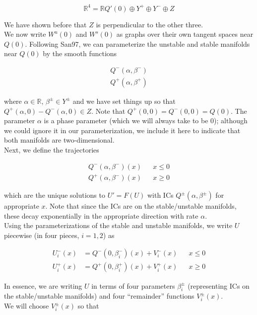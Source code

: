\documentclass[12pt]{article}
\def\R{{\mathbb R}}
\begin{document}
\[
\R^4 = \R Q'(0) \oplus Y^+ \oplus Y^- \oplus Z
\]
 
We have shown before that $Z$ is perpendicular to the other three. \\

We now write $W^u(0)$ and $W^s(0)$ as graphs over their own tangent spaces near $Q(0)$. Following San97, we can parameterize the unstable and stable manifolds near $Q(0)$ by the smooth functions

\begin{align*}
Q^-(\alpha, \beta^-) \\
Q^+(\alpha, \beta^+)
\end{align*}

where $\alpha \in \R$, $\beta^\pm \in Y^\pm$ and we have set things up so that $Q^+(\alpha, 0) - Q^-(\alpha, 0) \in Z$. Note that $Q^+(0, 0) = Q^-(0, 0) = Q(0)$. The parameter $\alpha$ is a phase parameter (which we will always take to be 0); although we could ignore it in our parameterization, we include it here to indicate that both manifolds are two-dimensional. \\

Next, we define the trajectories

\begin{align*}
Q^-(\alpha, \beta^-)(x) && x \leq 0 \\
Q^+(\alpha, \beta^-)(x) && x \geq 0
\end{align*}

which are the unique solutions to $U' = F(U)$ with ICs $Q^\pm(\alpha, \beta^\pm)$ for appropriate $x$. Note that since the ICs are on the stable/unstable manifolds, these decay exponentially in the appropriate direction with rate $\alpha$.\\

Using the parameterizations of the stable and unstable manifolds, we write $U$ piecewise (in four pieces, $i = 1, 2$) as

\begin{align*}
U_i^-(x) &= Q^-(0, \beta_i^-)(x) + V_i^-(x) && x \leq 0 \\
U_i^+(x) &= Q^+(0, \beta_i^+)(x) + V_i^+(x) && x \geq 0
\end{align*}

In essence, we are writing $U$ in terms of four parameters $\beta_i^\pm$ (representing ICs on the stable/unstable manifolds) and four ``remainder'' functions $V_i^\pm(x)$.\\

We will choose $V_i^\pm(x)$ so that
\end{document}
